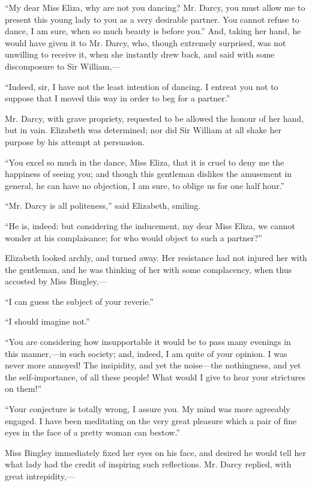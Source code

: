 ``My dear Miss Eliza, why are not you dancing? Mr. Darcy, you must allow me to present this young lady to you as a very desirable partner. You cannot refuse to dance, I am sure, when so much beauty is before you.'' And, taking her hand, he would have given it to Mr. Darcy, who, though extremely surprised, was not unwilling to receive it, when she instantly drew back, and said with some discomposure to Sir William,---

``Indeed, sir, I have not the least intention of dancing. I entreat you not to suppose that I moved this way in order to beg for a partner.''

Mr. Darcy, with grave propriety, requested to be allowed the honour of her hand, but in vain. Elizabeth was determined; nor did Sir William at all shake her purpose by his attempt at persuasion.

``You excel so much in the dance, Miss Eliza, that it is cruel to deny me the happiness of seeing you; and though this gentleman dislikes the amusement in general, he can have no objection, I am sure, to oblige us for one half hour.''

``Mr. Darcy is all politeness,'' said Elizabeth, smiling.

``He is, indeed: but considering the inducement, my dear Miss Eliza, we cannot wonder at his complaisance; for who would object to such a partner?''

Elizabeth looked archly, and turned away. Her resistance had not injured her with the gentleman, and he was thinking of her with some complacency, when thus accosted by Miss Bingley,---

``I can guess the subject of your reverie.''

``I should imagine not.''

``You are considering how insupportable it would be to pass many evenings in this manner,---in such society; and, indeed, I am quite of your opinion. I was never more annoyed! The insipidity, and yet the noise---the nothingness, and yet the self-importance, of all these people! What would I give to hear your strictures on them!''

``Your conjecture is totally wrong, I assure you. My mind was more agreeably engaged. I have been meditating on the very great pleasure which a pair of fine eyes in the face of a pretty woman can bestow.''

Miss Bingley immediately fixed her eyes on his face, and desired he would tell her what lady had the credit of inspiring such reflections. Mr. Darcy replied, with great intrepidity,---

